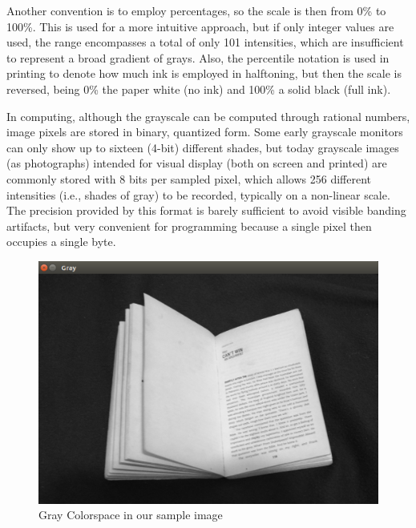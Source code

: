 \documentclass[BTech]{srmuthesis}
\begin{document}
Another convention is to employ percentages, so the scale is then from 0\% to 100\%. This is used for a more intuitive approach, but if only integer values are used, the range encompasses a total of only 101 intensities, which are insufficient to represent a broad gradient of grays. Also, the percentile notation is used in printing to denote how much ink is employed in halftoning, but then the scale is reversed, being 0\% the paper white (no ink) and 100\% a solid black (full ink).

In computing, although the grayscale can be computed through rational numbers, image pixels are stored in binary, quantized form. Some early grayscale monitors can only show up to sixteen (4-bit) different shades, but today grayscale images (as photographs) intended for visual display (both on screen and printed) are commonly stored with 8 bits per sampled pixel, which allows 256 different intensities (i.e., shades of gray) to be recorded, typically on a non-linear scale. The precision provided by this format is barely sufficient to avoid visible banding artifacts, but very convenient for programming because a single pixel then occupies a single byte.

\begin{figure}[!hb]
    \centering
    \includegraphics[width=15cm\textwidth]{gray_colorspace}
    \caption{Gray Colorspace in our sample image}
    \label{fig:Gray Colorspace}
\end{figure}
\end{document}
